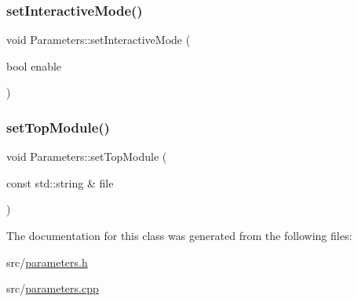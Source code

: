 \subsubsection{\texorpdfstring{set\+Interactive\+Mode()}{setInteractiveMode()}}
{\footnotesize\ttfamily void Parameters\+::set\+Interactive\+Mode (\begin{DoxyParamCaption}\item[{bool}]{enable }\end{DoxyParamCaption})\hspace{0.3cm}{\ttfamily [inline]}}

\mbox{\label{classParameters_a6662cf32d6ef8e012bbdd30a0eabfa15}} 
\subsubsection{\texorpdfstring{set\+Top\+Module()}{setTopModule()}}
{\footnotesize\ttfamily void Parameters\+::set\+Top\+Module (\begin{DoxyParamCaption}\item[{const std\+::string \&}]{file }\end{DoxyParamCaption})\hspace{0.3cm}{\ttfamily [inline]}}



The documentation for this class was generated from the following files\+:\begin{DoxyCompactItemize}
\item 
src/\hyperlink{parameters_8h}{parameters.\+h}\item 
src/\hyperlink{parameters_8cpp}{parameters.\+cpp}\end{DoxyCompactItemize}
